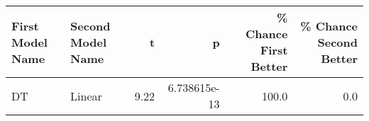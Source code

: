 \begin{tabular}{llrrrr}
\toprule
First Model Name & Second Model Name &    t &            p &  \% Chance First Better &  \% Chance Second Better \\
\midrule
              DT &            Linear & 9.22 & 6.738615e-13 &                  100.0 &                     0.0 \\
\bottomrule
\end{tabular}
